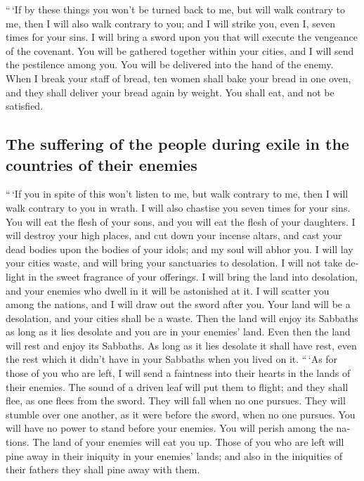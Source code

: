 \begin{paracol}{2}
\begin{otherlanguage}{english}
 ``\,`If by these things you won't be turned back to me,
but will walk contrary to me,  then I will also walk
contrary to you; and I will strike you, even I, seven times for your
sins.  I will bring a sword upon you that will execute
the vengeance of the covenant. You will be gathered together within your
cities, and I will send the pestilence among you. You will be delivered
into the hand of the enemy.  When I break your staff of
bread, ten women shall bake your bread in one oven, and they shall
deliver your bread again by weight. You shall eat, and not be satisfied.

\hypertarget{the-suffering-of-the-people-during-exile-in-the-countries-of-their-enemies}{%
\subsection{The suffering of the people during exile in the countries of
their
enemies}\label{the-suffering-of-the-people-during-exile-in-the-countries-of-their-enemies}}

 ``\,`If you in spite of this won't listen to me, but
walk contrary to me,  then I will walk contrary to you in
wrath. I will also chastise you seven times for your sins.
 You will eat the flesh of your sons, and you will eat
the flesh of your daughters.  I will destroy your high
places, and cut down your incense altars, and cast your dead bodies upon
the bodies of your idols; and my soul will abhor you.  I
will lay your cities waste, and will bring your sanctuaries to
desolation. I will not take delight in the sweet fragrance of your
offerings.  I will bring the land into desolation, and
your enemies who dwell in it will be astonished at it.  I
will scatter you among the nations, and I will draw out the sword after
you. Your land will be a desolation, and your cities shall be a waste.
 Then the land will enjoy its Sabbaths as long as it lies
desolate and you are in your enemies' land. Even then the land will rest
and enjoy its Sabbaths.  As long as it lies desolate it
shall have rest, even the rest which it didn't have in your Sabbaths
when you lived on it.  ``\,`As for those of you who are
left, I will send a faintness into their hearts in the lands of their
enemies. The sound of a driven leaf will put them to flight; and they
shall flee, as one flees from the sword. They will fall when no one
pursues.  They will stumble over one another, as it were
before the sword, when no one pursues. You will have no power to stand
before your enemies.  You will perish among the nations.
The land of your enemies will eat you up.  Those of you
who are left will pine away in their iniquity in your enemies' lands;
and also in the iniquities of their fathers they shall pine away with
them.


\end{otherlanguage}
\end{paracol}
